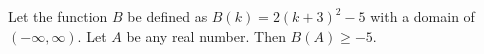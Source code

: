 \documentclass{ximera}
\begin{document}
\begin{exercise}
Let the function $B$ be defined as $B(k) = 2(k+3)^2 - 5$ with a domain of $(-\infty, \infty)$. Let $A$ be any real number. Then $B(A) \geq -5$.

\begin{multipleChoice}
\end{multipleChoice}

\end{exercise}
\end{document}
